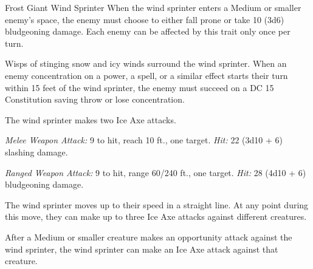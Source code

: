 \documentclass[10pt,a4paper,twoside,bg=print,twocolumn,openany,nodeprecatedcode]{dndbook}
\begin{document}
\begin{DndMonster}[float=t]{Frost Giant Wind Sprinter}
\DndMonsterBasics[
armor-class = {15 (issenblau plating)},
hit-points = {\DndDice{11d12 + 44}},
speed = {60 ft., climb 30 ft.}
]
\DndMonsterAbilityScores[
 str = 23,
 dex = 9,
 con = 18,
 int = 9,
 wis = 10,
 cha = 10
]
\DndMonsterDetails[
saving-throws = {Str +9, Con +7},
skills = {Athletics +9, Intimidation +3, Perception +3},
damage-immunities = {cold},
languages = {Giant},
challenge = 8,
]
When the wind sprinter enters a Medium or smaller enemy's space, the enemy must choose to either fall prone or take 10 (3d6) bludgeoning damage. Each enemy can be affected by this trait only once per turn.

Wisps of stinging snow and icy winds surround the wind sprinter. When an enemy concentration on a power, a spell, or a similar effect starts their turn within 15 feet of the wind sprinter, the enemy must succeed on a DC 15 Constitution saving throw or lose concentration.

The wind sprinter makes two Ice Axe attacks.

\textsl{Melee Weapon Attack:} 9 to hit, reach 10 ft., one target. \textsl{Hit:} 22 (3d10 + 6) slashing damage.

\textsl{Ranged Weapon Attack:} 9 to hit, range 60/240 ft., one target. \textsl{Hit:} 28 (4d10 + 6) bludgeoning damage.

The wind sprinter moves up to their speed in a straight line. At any point during this move, they can make up to three Ice Axe attacks against different creatures.

After a Medium or smaller creature makes an opportunity attack against the wind sprinter, the wind sprinter can make an Ice Axe attack against that creature.

\end{DndMonster}


\clearpage
\end{document}
